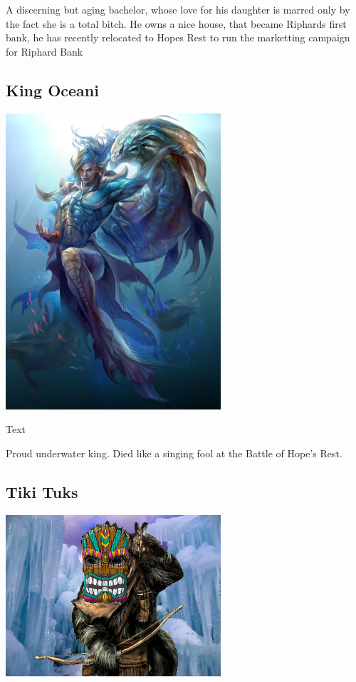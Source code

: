 \noindent 

A discerning but aging bachelor, whose love for his daughter is marred only by the fact she is a total bitch. He owns a nice house, that became Riphards first bank, he has recently relocated to Hopes Rest to run the marketting campaign for Riphard Bank

\smallskip

\subsection*{King Oceani} 

\begin{center}
\includegraphics[width=80mm]{./content/img/kingOceani.jpg}
\begin{figure}[h]
\end{figure}
\end{center}

\noindent 

Text

Proud underwater king.  Died like a singing fool at the Battle of Hope's Rest.  

\smallskip

\subsection*{Tiki Tuks} 

\begin{center}
\includegraphics[width=80mm]{./content/img/tikiTuk.png}
\begin{figure}[h]
\end{figure}
\end{center}

